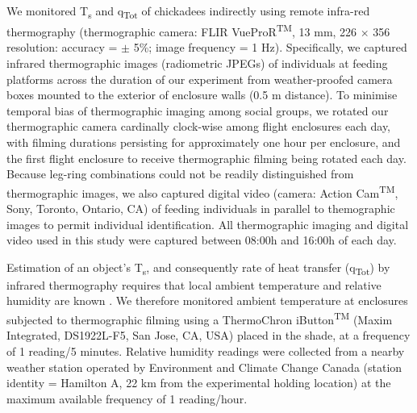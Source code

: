\documentclass[12pt]{article}
\begin{document}
\noindent We monitored T\textsubscript{s} and q\textsubscript{Tot} of chickadees indirectly using remote infra-red thermography (thermographic camera: FLIR VueProR\textsuperscript{TM}, 13 mm, 226 $\times$ 356 resolution: accuracy = $\pm$ 5\%; image frequency = 1 Hz). Specifically, we captured infrared thermographic images (radiometric JPEGs) of individuals at feeding platforms across the duration of our experiment from weather-proofed camera boxes mounted to the exterior of enclosure walls (0.5 m distance). To minimise temporal bias of thermographic imaging among social groups, we rotated our thermographic camera cardinally clock-wise among flight enclosures each day, with filming durations persisting for approximately one hour per enclosure, and the first flight enclosure to receive thermographic filming being rotated each day. Because leg-ring combinations could not be readily distinguished from thermographic images, we also captured digital video (camera: Action Cam\textsuperscript{TM}, Sony, Toronto, Ontario, CA) of feeding individuals in parallel to themographic images to permit individual identification. All thermographic imaging and digital video used in this study were captured between 08:00h and 16:00h of each day. \vspace{1cm}
  
\noindent Estimation of an object's T\textsubscript{s}, and consequently rate of heat transfer (q\textsubscript{Tot}) by infrared thermography requires that local ambient temperature and relative humidity are known \citep{minkina_2009,tattersall_2016}. We therefore monitored ambient temperature at enclosures subjected to thermographic filming using a ThermoChron iButton\textsuperscript{TM} (Maxim Integrated, DS1922L-F5, San Jose, CA, USA) placed in the shade, at a frequency of 1 reading/5 minutes. Relative humidity readings were collected from a nearby weather station operated by Environment and Climate Change Canada (station identity = Hamilton A, 22 km from the experimental holding location) at the maximum available frequency of 1 reading/hour. \vspace{1cm} 
\end{document}
